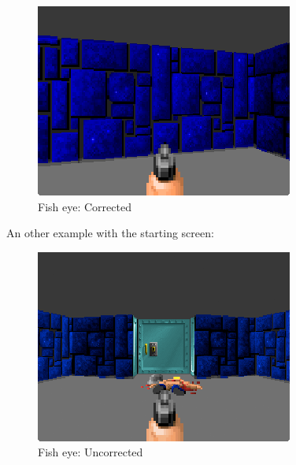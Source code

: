   \begin{figure}[H]
\centering
 \includegraphics[width=\textwidth]{screenshots/fish_eye/fish_eye_corrected.png}
\caption{Fish eye: Corrected} 
 \end{figure}
 \par
 An other example with the starting screen:\\
 \par
  \begin{figure}[H]
\centering
 \includegraphics[width=\textwidth]{screenshots/fish_eye/fish_eyed_start_screen2.png}
  \caption{Fish eye: Uncorrected} 
 \end{figure}
 \par

